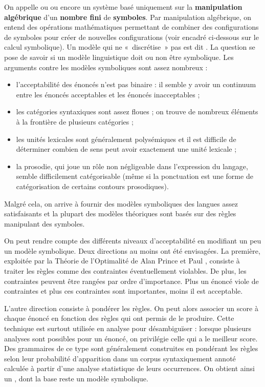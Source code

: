 On appelle  ou  ou encore  un système basé uniquement sur la \textbf{manipulation algébrique} d’un \textbf{nombre fini} de \textbf{symboles}. Par manipulation algébrique, on entend des opérations mathématiques permettant de combiner des configurations de symboles pour créer de nouvelles configurations (voir encadré ci-dessous sur le calcul symbolique). Un modèle qui ne «~discrétise~» pas est dit . La question se pose de savoir si un modèle linguistique doit ou non être symbolique. Les arguments contre les modèles symboliques sont assez nombreux :

\begin{itemize}
\item l’acceptabilité des énoncés n’est pas binaire : il semble y avoir un continuum entre les énoncés acceptables et les énoncés inacceptables ;
\item les catégories syntaxiques sont assez floues ; on trouve de nombreux éléments à la frontière de plusieurs catégories ;
\item les unités lexicales sont généralement polysémiques et il est difficile de déterminer combien de sens peut avoir exactement une unité lexicale ;
\item la prosodie, qui joue un rôle non négligeable dans l’expression du langage, semble difficilement catégorisable (même si la ponctuation est une forme de catégorisation de certains contours prosodiques).
\end{itemize}

Malgré cela, on arrive à fournir des modèles symboliques des langues assez satisfaisants et la plupart des modèles théoriques sont basés sur des règles manipulant des symboles.

On peut rendre compte des différents niveaux d’acceptabilité en modifiant un peu un modèle symbolique. Deux directions au moins ont été envisagées. La première, exploitée par la Théorie de l’Optimalité de Alan Prince et Paul \citet{Smolensky1993}, consiste à traiter les règles comme des contraintes éventuellement violables. De plus, les contraintes peuvent être rangées par ordre d’importance. Plus un énoncé viole de contraintes et plus ces contraintes sont importantes, moins il est acceptable.

L’autre direction consiste à pondérer les règles. On peut alors associer un score à chaque énoncé en fonction des règles qui ont permis de le produire. Cette technique est surtout utilisée en analyse pour désambiguïser : lorsque plusieurs analyses sont possibles pour un énoncé, on privilégie celle qui a le meilleur score. Des grammaires de ce type sont généralement construites en pondérant les règles selon leur probabilité d’apparition dans un corpus syntaxiquement annoté calculée à partir d’une analyse statistique de leurs occurrences. On obtient ainsi un , dont la base reste un modèle symbolique.

